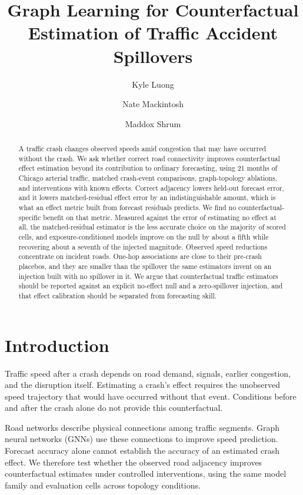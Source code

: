 \documentclass[sigconf,nonacm]{acmart}
\title[Traffic Accident Spillovers]{Graph Learning for Counterfactual Estimation of Traffic Accident Spillovers}
\author{Kyle Luong}
\affiliation{\institution{University of Virginia}\city{Charlottesville}\state{Virginia}\country{USA}}
\author{Nate Mackintosh}
\affiliation{\institution{University of Virginia}\city{Charlottesville}\state{Virginia}\country{USA}}
\author{Maddox Shrum}
\affiliation{\institution{University of Virginia}\city{Charlottesville}\state{Virginia}\country{USA}}
\begin{document}
\begin{abstract}
A traffic crash changes observed speeds amid congestion that may have occurred without the crash. We ask whether correct road connectivity improves counterfactual effect estimation beyond its contribution to ordinary forecasting, using 21 months of Chicago arterial traffic, matched crash-event comparisons, graph-topology ablations, and interventions with known effects. Correct adjacency lowers held-out forecast error, and it lowers matched-residual effect error by an indistinguishable amount, which is what an effect metric built from forecast residuals predicts. We find no counterfactual-specific benefit on that metric. Measured against the error of estimating no effect at all, the matched-residual estimator is the less accurate choice on the majority of scored cells, and exposure-conditioned models improve on the null by about a fifth while recovering about a seventh of the injected magnitude. Observed speed reductions concentrate on incident roads. One-hop associations are close to their pre-crash placebos, and they are smaller than the spillover the same estimators invent on an injection built with no spillover in it. We argue that counterfactual traffic estimators should be reported against an explicit no-effect null and a zero-spillover injection, and that effect calibration should be separated from forecasting skill.
\end{abstract}
\maketitle

\section{Introduction}
Traffic speed after a crash depends on road demand, signals, earlier congestion, and the disruption itself. Estimating a crash's effect requires the unobserved speed trajectory that would have occurred without that event. Conditions before and after the crash alone do not provide this counterfactual.

Road networks describe physical connections among traffic segments. Graph neural networks (GNNs) use these connections to improve speed prediction. Forecast accuracy alone cannot establish the accuracy of an estimated crash effect. We therefore test whether the observed road adjacency improves counterfactual estimates under controlled interventions, using the same model family and evaluation cells across topology conditions.
\end{document}
